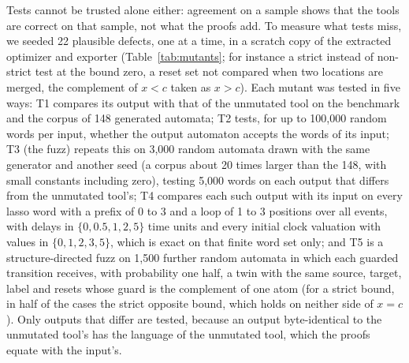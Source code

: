 Tests cannot be trusted alone either: agreement on a sample shows that the tools are correct on that sample, not what the proofs add. To measure what tests miss, we seeded 22 plausible defects, one at a time, in a scratch copy of the extracted optimizer and exporter (Table~\ref{tab:mutants}; for instance a strict instead of non-strict test at the bound zero, a reset set not compared when two locations are merged, the complement of $x<c$ taken as $x>c$). Each mutant was tested in five ways: T1 compares its output with that of the unmutated tool on the benchmark and the corpus of 148 generated automata; T2 tests, for up to 100{,}000 random words per input, whether the output automaton accepts the words of its input; T3 (the fuzz) repeats this on 3{,}000 random automata drawn with the same generator and another seed (a corpus about 20 times larger than the 148, with small constants including zero), testing 5{,}000 words on each output that differs from the unmutated tool's; T4 compares each such output with its input on every lasso word with a prefix of 0 to 3 and a loop of 1 to 3 positions over all events, with delays in $\{0,0.5,1,2,5\}$ time units and every initial clock valuation with values in $\{0,1,2,3,5\}$, which is exact on that finite word set only; and T5 is a structure-directed fuzz on 1{,}500 further random automata in which each guarded transition receives, with probability one half, a twin with the same source, target, label and resets whose guard is the complement of one atom (for a strict bound, in half of the cases the strict opposite bound, which holds on neither side of $x=c$). Only outputs that differ are tested, because an output byte-identical to the unmutated tool's has the language of the unmutated tool, which the proofs equate with the input's.

